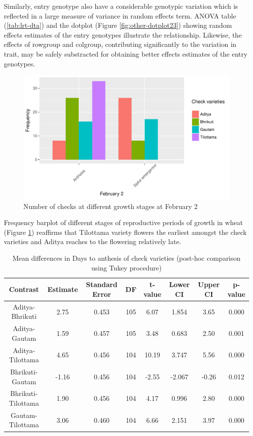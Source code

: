 \documentclass[12pt,oneside]{dukestatscithesis} %
\theoremstyle{definition}
\theoremstyle{definition}
\theoremstyle{definition}
\theoremstyle{remark}
\begin{document}
Similarly, entry genotype also have a considerable genotypic variation
which is reflected in a large measure of variance in random effects
term. ANOVA table (\ref{tab:lrt-dta}) and the dotplot (Figure
\ref{fig:other-dotplot23}) showing random effects estimates of the entry
genotypes illustrate the relationship. Likewise, the effects of rowgroup
and colgroup, contributing significantly to the variation in trait, may
be safely substracted for obtaining better effects estimates of the
entry genotypes.
\begin{figure}

{\centering \includegraphics[width=0.80\linewidth]{thesis_files/figure-latex/cor-graph-barplot-viz-checks-1} 

}

\caption{Number of checks at different growth stages at February 2}\label{fig:cor-graph-barplot-viz-checks}
\end{figure}
Frequency barplot of different stages of reproductive periods of growth
in wheat (Figure \ref{fig:cor-graph-barplot-viz-checks}) reaffirms that
Tilottama variety flowers the earliest amongst the check varieties and
Aditya reaches to the flowering relatively late.
\begin{table}[H]

\caption{\label{tab:other-meanconf-tab7}Mean differences in Days to anthesis of check varieties (post-hoc comparison using Tukey procedure)}
\centering
\begin{tabular}[t]{cccccccc}
\toprule
Contrast & Estimate & Standard Error & DF & t-value & Lower CI & Upper CI & p-value\\
\midrule
Aditya-Bhrikuti & 2.75 & 0.453 & 105 & 6.07 & 1.854 & 3.65 & 0.000\\
Aditya-Gautam & 1.59 & 0.457 & 105 & 3.48 & 0.683 & 2.50 & 0.001\\
Aditya-Tilottama & 4.65 & 0.456 & 104 & 10.19 & 3.747 & 5.56 & 0.000\\
Bhrikuti-Gautam & -1.16 & 0.456 & 104 & -2.55 & -2.067 & -0.26 & 0.012\\
Bhrikuti-Tilottama & 1.90 & 0.456 & 104 & 4.17 & 0.996 & 2.80 & 0.000\\
Gautam-Tilottama & 3.06 & 0.460 & 104 & 6.66 & 2.151 & 3.97 & 0.000\\
\bottomrule
\end{tabular}
\end{table}
\end{document}

